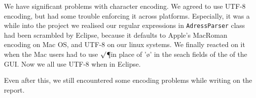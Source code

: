 
We have significant problems with character encoding. We agreed to use UTF-8 encoding, but had some trouble enforcing it across platforms. Especially, it was a while into the project we realised our regular expressions in \texttt{AdressParser} class had been scrambled by Eclipse, because it defaults to Apple's MacRoman encoding on Mac OS, and UTF-8 on our linux systems. 
We finally reacted on it when the Mac users had to use $\surd$\P in place of '\o' in the seach fields of the of the GUI. Now we all use UTF-8 when in Eclipse. 

Even after this, we still encountered some encoding problems while writing on the report.
